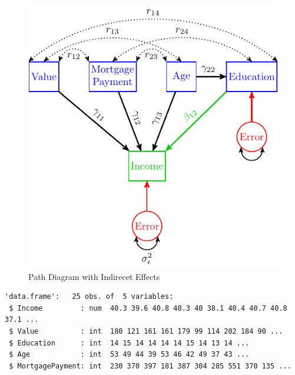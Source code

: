 \begin{figure}[H]

{\centering \includegraphics[width=0.8\linewidth]{images/Reg3} 

}

\caption{Path Diagram with Indirecet Effects}\label{fig:Reg3}
\end{figure}

\begin{Shaded}
\begin{Highlighting}[]
\NormalTok{(}\NormalTok{)}
\end{Highlighting}
\end{Shaded}

\begin{verbatim}
'data.frame':   25 obs. of  5 variables:
 $ Income         : num  40.3 39.6 40.8 40.3 40 38.1 40.4 40.7 40.8 37.1 ...
 $ Value          : int  180 121 161 161 179 99 114 202 184 90 ...
 $ Education      : int  14 15 14 14 14 14 15 14 13 14 ...
 $ Age            : int  53 49 44 39 53 46 42 49 37 43 ...
 $ MortgagePayment: int  230 370 397 181 387 304 285 551 370 135 ...
\end{verbatim}

